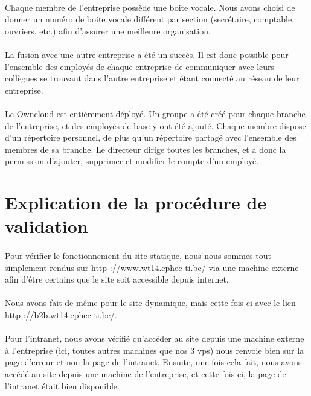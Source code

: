 \documentclass[a4paper,12pt]{article}
\begin{document}
	\paragraph{} Chaque membre de l’entreprise possède une boite vocale. Nous avons choisi de
donner un numéro de boite vocale différent par section (secrétaire, comptable, ouvriers,
etc.) afin d’assurer une meilleure organisation.
	\paragraph{} La fusion avec une autre entreprise a été un succès. Il est donc possible pour l’ensemble
des employés de chaque entreprise de communiquer avec leurs collègues se
trouvant dans l’autre entreprise et étant connecté au réseau de leur entreprise.

	\paragraph{} Le Owncloud est entièrement déployé. Un groupe a été créé pour chaque branche de l'entreprise, et des employés de base y ont été ajouté. Chaque membre dispose d'un répertoire personnel, de plus qu'un répertoire partagé avec l'ensemble des membres de sa branche. Le directeur dirige toutes les branches, et a donc la permission d'ajouter, supprimer et modifier le compte d'un employé. 
	
\section{Explication de la procédure de validation}
	\paragraph{} Pour vérifier le fonctionnement du site statique, nous nous sommes tout simplement
rendus sur http ://www.wt14.ephec-ti.be/ via une machine externe afin d’être
certains que le site soit accessible depuis internet.
	\paragraph{} Nous avons fait de même pour le site dynamique, mais cette fois-ci avec le lien
http ://b2b.wt14.ephec-ti.be/. 
	\paragraph{} Pour l’intranet, nous avons vérifié qu’accéder au site depuis une machine externe à
l’entreprise (ici, toutes autres machines que nos 3 vps) nous renvoie bien sur la page
d’erreur et non la page de l’intranet. Ensuite, une fois cela fait, nous avons accédé
au site depuis une machine de l’entreprise, et cette fois-ci, la page de l’intranet était
bien disponible.
\end{document}
